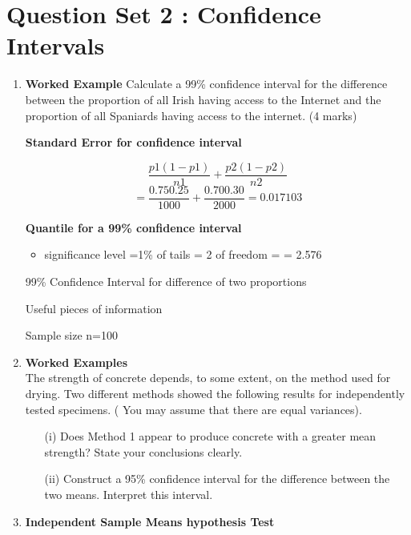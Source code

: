 \section*{Question Set 2 : Confidence Intervals}
\begin{enumerate}

\item \textbf{Worked Example}
Calculate a 99\% confidence interval for the difference between the proportion of all Irish having access to the
Internet and the proportion of all Spaniards having access to the internet.  (4 marks)



\noindent \textbf{Standard Error for confidence interval}

\[\frac{p1(1 -p1)}{n1}+ \frac{p2(1 -p2)}{n2}\]
\[=\frac{0.750.25}{1000}+ \frac{0.700.30}{2000}     =  0.017103\]

\noindent \textbf{Quantile for a 99\% confidence interval}
\begin{itemize}
\item significance level  =1\%
\itemnumber of tails = 2
\itemdegrees of freedom = 
\itemquantile = 2.576 
\end{itemize}



99\% Confidence Interval for difference of two proportions



Useful pieces of information


Sample size  n=100


\item \textbf{Worked Examples} \\

The strength of concrete depends, to some extent, on the method used for drying. Two different methods showed the following results for independently tested specimens.  ( You may assume that there are equal variances).


\begin{itemize}
\item[(i)] Does Method 1 appear to produce concrete with a greater mean strength? State your conclusions clearly.
\item[(ii)] Construct a 95\% confidence interval for the difference between the two means. Interpret this interval.

\end{itemize}

\item \textbf{Independent Sample Means hypothesis Test }


\end{enumerate}
